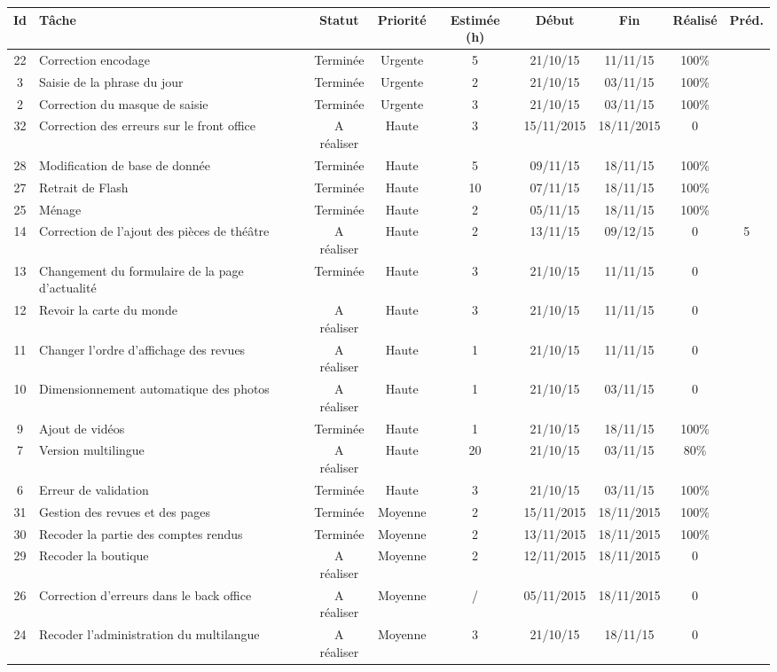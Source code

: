 \begin{tabular}{ | c | p{4cm} | c | c | c | c | c | c | c |  }
\hline 
Id & Tâche & Statut & Priorité & Estimée (h) & Début & Fin & Réalisé &
Préd. \\ \hline


22 & Correction encodage & Terminée & Urgente & 5 & 21/10/15 & 11/11/15 & 100\%
	 & \\ \hline
3 & Saisie de la phrase du jour & Terminée & Urgente & 2 & 21/10/15 & 03/11/15
	& 100\% & \\ \hline
2 & Correction du masque de saisie & Terminée & Urgente & 3 & 21/10/15 &
	03/11/15 & 100\% & \\ \hline
	
32 & Correction des erreurs sur le front office & A réaliser & Haute & 3
	& 15/11/2015 & 18/11/2015 & 0 & \\ \hline
28 & Modification de base de donnée & Terminée & Haute & 5 & 09/11/15 & 18/11/15
& 100\% & \\ \hline
27 & Retrait de Flash & Terminée & Haute & 10 & 07/11/15 & 18/11/15 & 100\%
& \\ \hline
25 & Ménage & Terminée & Haute & 2 & 05/11/15 & 18/11/15 & 100\%
& \\ \hline
14 & Correction de l'ajout des pièces de théâtre & A réaliser & Haute & 2 &
	13/11/15 & 09/12/15 & 0 & 5 \\ \hline
13 & Changement du formulaire de la page d'actualité & Terminée & Haute & 3 &
	21/10/15 & 11/11/15 & 0 & \\ \hline
12 & Revoir la carte du monde & A réaliser & Haute & 3 & 21/10/15 & 11/11/15 & 0
	& \\ \hline
11 & Changer l'ordre d'affichage des revues & A réaliser & Haute & 1 & 21/10/15
	& 11/11/15 & 0 & \\ \hline
10 & Dimensionnement automatique des photos & A réaliser & Haute & 1 & 21/10/15
	& 03/11/15 & 0 & \\ \hline
9 & Ajout de vidéos & Terminée & Haute & 1 & 21/10/15 & 18/11/15 & 100\% & \\
\hline
7 & Version multilingue & A réaliser & Haute & 20 & 21/10/15 & 03/11/15 & 80\% &
\\
\hline
6 & Erreur de validation & Terminée & Haute & 3 & 21/10/15 & 03/11/15 & 100\%
& \\ \hline



31 & Gestion des revues et des pages & Terminée & Moyenne & 2 & 15/11/2015
	& 18/11/2015 & 100\% & \\ \hline
30 & Recoder la partie des comptes rendus & Terminée & Moyenne & 2 & 13/11/2015
	& 18/11/2015 & 100\% & \\ \hline
29 & Recoder la boutique & A réaliser & Moyenne & 2
	& 12/11/2015 & 18/11/2015 & 0 & \\ \hline
26 & Correction d'erreurs dans le back office & A réaliser &
Moyenne & / & 05/11/2015 & 18/11/2015 & 0 & \\ \hline
24 & Recoder l'administration du
	multilangue & A réaliser & Moyenne & 3 & 21/10/15 & 18/11/15 & 0 & \\ \hline
	

\end{tabular}
